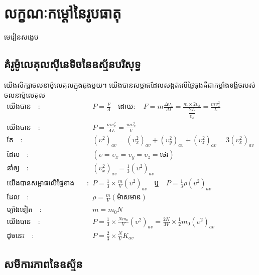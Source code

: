 \chapter{លក្ខណៈកម្តៅនៃរូបធាតុ}
\begin{center}
	{\Large \kml\color{magenta}មេរៀនសង្ខេប}
\end{center}
\section{គំរូម៉ូលេគុលស៊ីនេទិចនៃឧស្ម័នបរិសុទ្ធ}
\quad យើងសិក្សាចលនាម៉ូលេគុលក្នុងធុងមួយ។ យើងបានសម្ពាធដែលសង្តត់លើផ្ទៃធុងគឺជាកម្លាំងទង្គិចរបស់ចលនាម៉ូលេគុល
\begin{align*}
\text{យើងបាន}\quad :&\quad P=\frac{F}{A}\quad \text{ដោយ}: \quad F=m\frac{\Delta \upsilon_{x}}{\Delta t}=\frac{m\times2\upsilon_{x}}{\dfrac{2L}{\upsilon_{x}}}=\frac{m\upsilon^{2}_{x}}{L}\\
\text{យើងបាន}\quad :&\quad P=\frac{m\upsilon^{2}_{x}}{AL}=\frac{m\upsilon^{2}_{x}}{V}\\
\text{តែ}\quad :&\quad \left(\upsilon^{2}\right)_{av}=\left(\upsilon^{2}_{x}\right)_{av}+\left(\upsilon^{2}_{y}\right)_{av}+\left(\upsilon^{2}_{z}\right)_{av}=3\left(\upsilon^{2}_{x}\right)_{av}\\\text{ដែល}\quad :&\quad \left(\upsilon=\upsilon_{x}=\upsilon_{y}=\upsilon_{z}=\text{ថេរ}\right)\\
\text{នាំឲ្យ}\quad :&\quad \left(\upsilon^2_{x}\right)_{av}=\frac{1}{3}\left(\upsilon^2\right)_{av}\\
\text{យើងបានសម្ពាធលើផ្ទៃខាងនីមួយៗ កំណត់ដោយៈ}\quad :&\quad P=\frac{1}{3}\times\frac{m}{V}\left(\upsilon^{2}\right)_{av}\quad \text{ឬ}\quad P=\frac{1}{3}\rho\left(\upsilon^{2}\right)_{av}\\
\text{ដែល}\quad :&\quad \rho =\frac{m}{V}\left(\text{ម៉ាសមាឌ}\right)\\
\text{ម្យ៉ាងទៀត}\quad :&\quad m=m_{0}N\\
\text{យើងបាន}\quad :&\quad P=\frac{1}{3}\times\frac{Nm_{0}}{V}\left(\upsilon^{2}\right)_{av}=\frac{2N}{3V}\times\frac{1}{2}m_{0}\left(\upsilon^2\right)_{av}\\
\text{ដូចនេះ}\quad :&\quad P=\frac{2}{3}\times\frac{N}{V}K_{av}
\end{align*}
\section{សមីការភាពនៃឧស្ម័ន}
